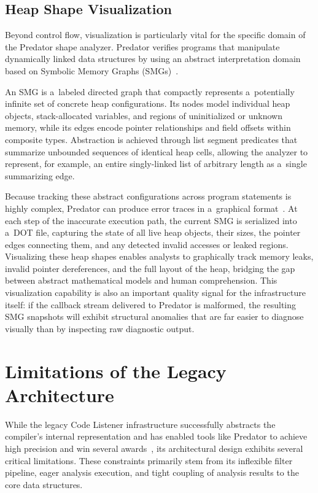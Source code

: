 \documentclass[xpsejal00-gcc-plugin.tex]{subfiles}
\begin{document}
\subsection*{Heap Shape Visualization}\label{sub:heap-shape}

Beyond control flow, visualization is particularly vital for the specific domain of the Predator shape analyzer.
Predator verifies programs that manipulate dynamically linked data structures by using an abstract interpretation domain based on Symbolic Memory Graphs (SMGs)~\cite{PredatorSuite2016}.

An SMG is a~labeled directed graph that compactly represents a~potentially infinite set of concrete heap configurations.
Its nodes model individual heap objects, stack-allocated variables, and regions of uninitialized or unknown memory, while its edges encode pointer relationships and field offsets within composite types.
Abstraction is achieved through list segment predicates that summarize unbounded sequences of identical heap cells, allowing the analyzer to represent, for example, an entire singly-linked list of arbitrary length as a~single summarizing edge.

Because tracking these abstract configurations across program statements is highly complex, Predator can produce error traces in a~graphical format~\cite{PredatorSuite2016}.
At each step of the inaccurate execution path, the current SMG is serialized into a~DOT file, capturing the state of all live heap objects, their sizes, the pointer edges connecting them, and any detected invalid accesses or leaked regions.
Visualizing these heap shapes enables analysts to graphically track memory leaks, invalid pointer dereferences, and the full layout of the heap, bridging the gap between abstract mathematical models and human comprehension.
This visualization capability is also an important quality signal for the infrastructure itself: if the callback stream delivered to Predator is malformed, the resulting SMG snapshots will exhibit structural anomalies that are far easier to diagnose visually than by inspecting raw diagnostic output.

\section{Limitations of the Legacy Architecture}\label{sec:limitations}

While the legacy Code Listener infrastructure successfully abstracts the compiler's internal representation and has enabled tools like Predator to achieve high precision and win several awards~\cite{PredatorWebsite}, its architectural design exhibits several critical limitations.
These constraints primarily stem from its inflexible filter pipeline, eager analysis execution, and tight coupling of analysis results to the core data structures.
\end{document}

